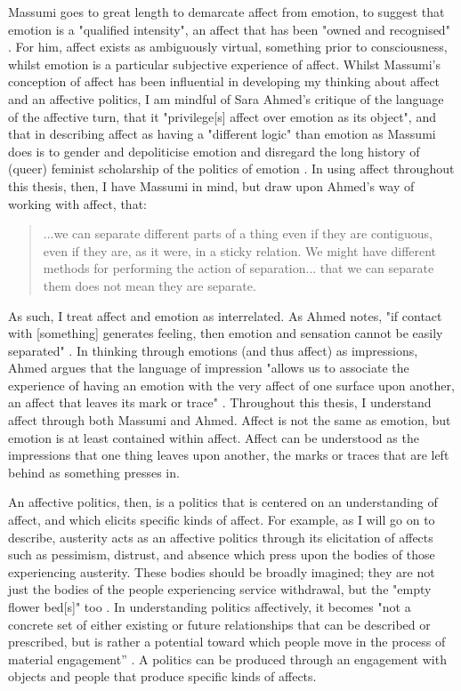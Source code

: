 Massumi goes to great length to demarcate affect from emotion, to suggest that emotion is a "qualified intensity", an affect that has been "owned and recognised" \citeyearpar[p. 88]{massumi_autonomy_1995}. For him, affect exists as ambiguously virtual, something prior to consciousness, whilst emotion is a particular subjective experience of affect. Whilst Massumi's conception of affect has been influential in developing my thinking about affect and an affective politics, I am mindful of Sara Ahmed's critique of the language of the affective turn, that it "privilege[s] affect over emotion as its object", and that in describing affect as having a "different logic" than emotion as Massumi does is to gender and depoliticise emotion and disregard the long history of (queer) feminist scholarship of the politics of emotion \citep[p. 207]{ahmed_cultural_2014}. In using affect throughout this thesis, then, I have Massumi in mind, but draw upon Ahmed's way of working with affect, that:
\begin{quote}
...we can separate different parts of a thing even if they are contiguous, even if they are, as it were, in a sticky relation. We might have different methods for performing the action of separation... that we can separate them does not mean they are separate.
\end{quote}
As such, I treat affect and emotion as interrelated. As Ahmed notes, "if contact with [something] generates feeling, then emotion and sensation cannot be easily separated" \citep[p. 6]{ahmed_cultural_2014}. In thinking through emotions (and thus affect) as impressions, Ahmed argues that the language of impression "allows us to associate the experience of having an emotion with the very affect of one surface upon another, an affect that leaves its mark or trace" \citep[p. 6]{ahmed_cultural_2014}.  Throughout this thesis, I understand affect through both Massumi and Ahmed. Affect is not the same as emotion, but emotion is at least contained within affect. Affect can be understood as the impressions that one thing leaves upon another, the marks or traces that are left behind as something presses in. 

An affective politics, then, is a politics that is centered on an understanding of affect, and which elicits specific kinds of affect. For example, as I will go on to describe, austerity acts as an affective politics through its elicitation of affects such as pessimism, distrust, and absence which press upon the bodies of those experiencing austerity. These bodies should be broadly imagined; they are not just the bodies of the people experiencing service withdrawal, but the "empty flower bed[s]" too  \cite[[p. 195]{raynor_dramatising_2017}. In understanding politics affectively, it becomes "not a concrete set of either existing or future relationships that can be described or prescribed, but is rather a potential toward which people move in the process of material engagement” \citep[p. 380]{knox_affective_2017}. A politics can be produced through an engagement with objects and people that produce specific kinds of affects. 

